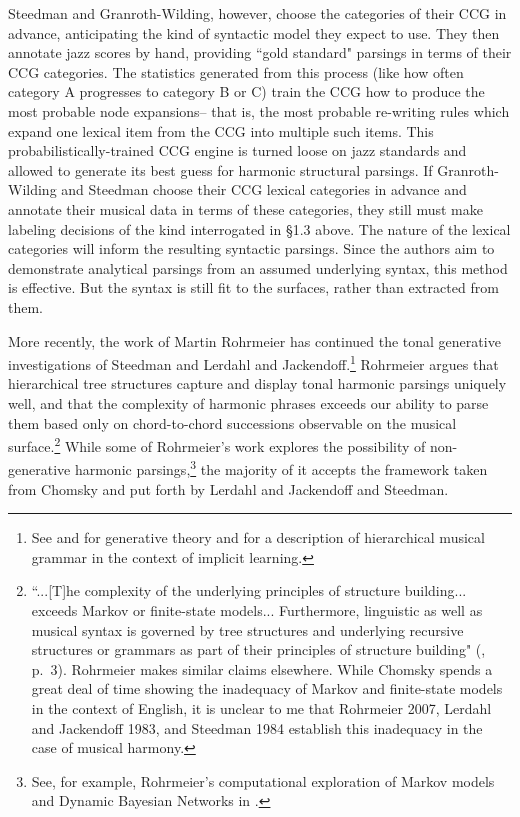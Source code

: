 Steedman and Granroth-Wilding, however, choose the categories of their CCG in advance, anticipating the kind of syntactic model they expect to use.  They then annotate jazz scores by hand, providing ``gold standard" parsings in terms of their CCG categories.  The statistics generated from this process (like how often category A progresses to category B or C) train the CCG how to produce the most probable node expansions-- that is, the most probable re-writing rules which expand one lexical item from the CCG into multiple such items.  This probabilistically-trained CCG engine is turned loose on jazz standards and allowed to generate its best guess for harmonic structural parsings.  If Granroth-Wilding and Steedman choose their CCG lexical categories in advance and annotate their musical data in terms of these categories, they still must make labeling decisions of the kind interrogated in \S 1.3 above.  The nature of the lexical categories will inform the resulting syntactic parsings.  Since the authors aim to demonstrate analytical parsings from an assumed underlying syntax, this method is effective.  But the syntax is still fit to the surfaces, rather than extracted from them.

More recently, the work of Martin Rohrmeier has continued the tonal generative investigations of Steedman and Lerdahl and Jackendoff.\footnote{See \cite{rohrmeier2007} and \cite{rohrmeier2011} for generative theory and \cite{rohrmeier2014} for a description of hierarchical musical grammar in the context of implicit learning.}  Rohrmeier argues that hierarchical tree structures capture and display tonal harmonic parsings uniquely well, and that the complexity of harmonic phrases exceeds our ability to parse them based only on chord-to-chord successions observable on the musical surface.\footnote{``...[T]he complexity of the underlying principles of structure building... exceeds Markov or finite-state models... Furthermore, linguistic as well as musical syntax is governed by tree structures and underlying recursive structures or grammars as part of their principles of structure building" (\cite{rohrmeier2014}, p.\ 3).  Rohrmeier makes similar claims elsewhere.  While Chomsky spends a great deal of time showing the inadequacy of Markov and finite-state models in the context of English, it is unclear to me that Rohrmeier 2007, Lerdahl and Jackendoff 1983, and Steedman 1984 establish this inadequacy in the case of musical harmony.}  While some of Rohrmeier's work explores the possibility of non-generative harmonic parsings,\footnote{See, for example, Rohrmeier's computational exploration of Markov models and Dynamic Bayesian Networks in \cite{rgra2012}.} the majority of it accepts the framework taken from Chomsky and put forth by Lerdahl and Jackendoff and Steedman.

